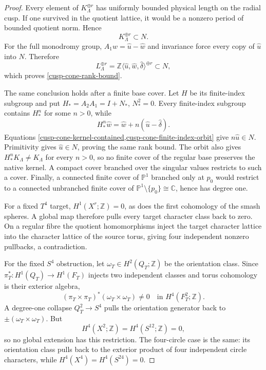 \begin{proof}
Every element of \(K_\Lambda^{\oplus r}\) has uniformly bounded physical
length on the radial cusp.  If one survived in the quotient lattice, it
would be a nonzero period of bounded quotient norm.  Hence
\begin{equation}
 K_\Lambda^{\oplus r}\subset N.
 \label{cusp-cone-kernel-contained}
\end{equation}
For the full monodromy group,
\(A_1\widehat w=\widehat u-\widehat w\) and invariance force every copy of
\(\widehat u\) into \(N\).  Therefore
\[
 L_\Lambda^{\oplus r}
 =\mathbb Z\langle\widehat u,\widehat w,\widehat\delta\rangle^{\oplus r}
 \subset N,
\]
which proves \cref{cusp-cone-rank-bound}.

The same conclusion holds after a finite base cover.  Let \(H\) be its
finite-index subgroup and put \(H_*=A_2A_1=I+N_*\), \(N_*^2=0\).
Every finite-index subgroup contains \(H_*^n\) for some \(n>0\), while
\begin{equation}
 H_*^n\widehat w
 =\widehat w+n(\widehat u-\widehat\delta).
 \label{cusp-cone-finite-index-orbit}
\end{equation}
Equations
\cref{cusp-cone-kernel-contained,cusp-cone-finite-index-orbit} give
\(n\widehat u\in N\).  Primitivity gives \(\widehat u\in N\), proving the
same rank bound.  The orbit also gives
\(H_*^nK_\Lambda\ne K_\Lambda\) for every \(n>0\), so no finite cover of
the regular base preserves the native kernel.  A compact cover branched
over the singular values restricts to such a cover.  Finally, a connected
finite cover of \(\mathbb P^1\) branched only at \(p_0\) would restrict to
a connected unbranched finite cover of
\(\mathbb P^1\setminus\{p_0\}\cong\mathbb C\), hence has degree one.

For a fixed \(T^4\) target, \(H^1(X^r;\mathbb Z)=0\), as does the first
cohomology of the smash spheres.  A global map therefore pulls every target
character class back to zero.  On a regular fibre the quotient homomorphisms
inject the target character lattice into the character lattice of the
source torus, giving four independent nonzero pullbacks, a contradiction.

For the fixed \(S^4\) obstruction, let
\(\omega_T\in H^2(Q_T;\mathbb Z)\) be the orientation class.  Since
\(\pi_T^*:H^1(Q_T)\to H^1(F_T)\) injects two independent classes and torus
cohomology is their exterior algebra,
\begin{equation}
 (\pi_T\times\pi_T)^*(\omega_T\times\omega_T)
 \ne0\quad\text{in }H^4(F_T^2;\mathbb Z).
 \label{cusp-cone-fibre-H4-nonzero}
\end{equation}
A degree-one collapse \(Q_T^2\to S^4\) pulls the orientation generator
back to \(\pm(\omega_T\times\omega_T)\).  But
\[
 H^4(X^2;\mathbb Z)=H^4(S^{12};\mathbb Z)=0,
\]
so no global extension has this restriction.  The four-circle case is the
same: its orientation class pulls back to the exterior product of four
independent circle characters, while
\(H^4(X^4)=H^4(S^{24})=0\).


\end{proof}
